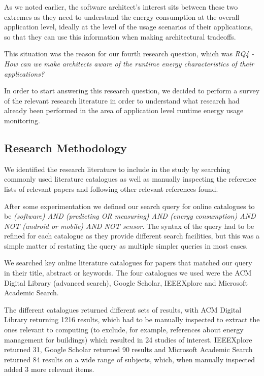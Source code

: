 As we noted earlier, the software architect's interest sits between these two extremes as they need to understand the energy consumption at the overall application level, ideally at the level of the usage scenarios of their applications, so that they can use this information when making architectural tradeoffs.

This situation was the reason for our fourth research question, which was \emph{
RQ4 - How can we make architects aware of the runtime energy characteristics of their applications?}

In order to start answering this research question, we decided to perform a survey of the relevant research literature in order to understand what research had already been performed in the area of application level runtime energy usage monitoring.

\subsection{Research Methodology}

We identified the research literature to include in the study by searching commonly used literature catalogues as well as manually inspecting the reference lists of relevant papers and following other relevant references found.

After some experimentation we defined our search query for online catalogues to be \emph{(software) AND (predicting OR measuring) AND (energy consumption) AND NOT (android or mobile) AND NOT sensor}.  The syntax of the query had to be refined for each catalogue as they provide different search facilities, but this was a simple matter of restating the query as multiple simpler queries in most cases.

We searched key online literature catalogues for papers that matched our query in their title, abstract or keywords.  The four catalogues we used were the ACM Digital Library (advanced search), Google Scholar, IEEEXplore and Microsoft Academic Search.

The different catalogues returned different sets of results, with ACM Digital Library returning 1216 results, which had to be manually inspected to extract the ones relevant to computing (to exclude, for example, references about energy management for buildings) which resulted in 24 studies of interest.  IEEEXplore returned 31, Google Scholar returned 90 results and Microsoft Academic Search returned 84 results on a wide range of subjects, which, when manually inspected added 3 more relevant items.


